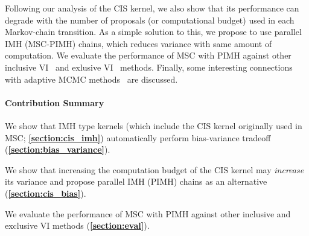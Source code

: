 Following our analysis of the CIS kernel, we also show that its performance can degrade with the number of proposals (or computational budget) used in each Markov-chain transition.
As a simple solution to this, we propose to use parallel IMH (MSC-PIMH) chains, which reduces variance with same amount of computation.
We evaluate the performance of MSC with PIMH against other inclusive VI~\citep{DBLP:journals/corr/BornscheinB14, NEURIPS2020_b2070693} and exlusive VI~\citep{pmlr-v33-ranganath14, JMLR:v18:16-107} methods.
Finally, some interesting connections with adaptive MCMC methods~\citep{10.1007/s11222-008-9110-y} are discussed.

\paragraph{Contribution Summary}
\begin{enumerate*}[label=\textbf{(\roman*)}]
\item We show that IMH type kernels (which include the CIS kernel originally used in MSC; \textbf{\cref{section:cis_imh}}) automatically perform bias-variance tradeoff (\textbf{\cref{section:bias_variance}}).
\item We show that increasing the computation budget of the CIS kernel may \textit{increase} its variance and propose parallel IMH (PIMH) chains as an alternative (\textbf{\cref{section:cis_bias}}).
\item We evaluate the performance of MSC with PIMH against other inclusive and exclusive VI methods (\textbf{\cref{section:eval}}).
\end{enumerate*}

